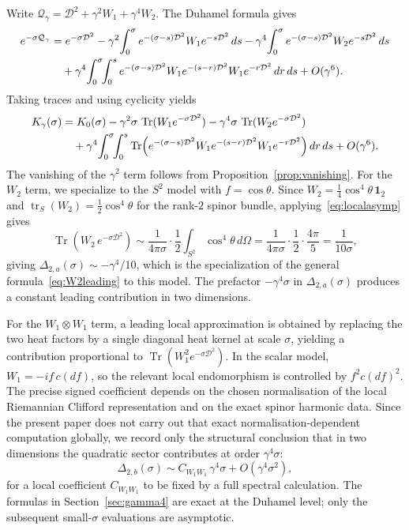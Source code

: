 \documentclass[11pt,a4paper]{article}
\numberwithin{equation}{section}
\theoremstyle{definition}
\newcommand{\cD}{\mathcal{D}}
\newcommand{\Qg}{\mathcal{Q}_\gamma}
\newcommand{\Tr}{\operatorname{Tr}}
\newcommand{\tr}{\operatorname{tr}}
\begin{document}
Write $\Qg=\cD^2+\gamma^2W_1+\gamma^4W_2$. The Duhamel formula gives
\begin{align}
e^{-\sigma\Qg}
&=e^{-\sigma\cD^2}
-\gamma^2\!\int_0^\sigma e^{-(\sigma-s)\cD^2}W_1e^{-s\cD^2}\,ds
-\gamma^4\!\int_0^\sigma e^{-(\sigma-s)\cD^2}W_2e^{-s\cD^2}\,ds
\notag\\
&\quad +\gamma^4\!\int_0^\sigma\!\!\int_0^s
e^{-(\sigma-s)\cD^2}W_1e^{-(s-r)\cD^2}W_1e^{-r\cD^2}\,dr\,ds
+O(\gamma^6).
\label{eq:duhamel_full}
\end{align}
Taking traces and using cyclicity yields
\begin{align}
K_\gamma(\sigma)
&=K_0(\sigma)
-\gamma^2\sigma\,\Tr(W_1e^{-\sigma\cD^2})
-\gamma^4\sigma\,\Tr(W_2e^{-\sigma\cD^2})\notag\\
&\quad +\gamma^4\!\int_0^\sigma\!\!\int_0^s
\Tr\!\left(e^{-(\sigma-s)\cD^2}W_1e^{-(s-r)\cD^2}W_1e^{-r\cD^2}\right)
dr\,ds+O(\gamma^6).
\end{align}
The vanishing of the $\gamma^2$ term follows from
Proposition~\ref{prop:vanishing}. For the $W_2$ term, we specialize to
the $S^2$ model with $f=\cos\theta$. Since
$W_2=\tfrac{1}{4}\cos^4\theta\,\mathbf{1}_2$ and
$\tr_S(W_2)=\tfrac{1}{2}\cos^4\theta$ for the rank-$2$ spinor bundle,
applying~\eqref{eq:localasymp} gives
\begin{equation}
\Tr(W_2\,e^{-\sigma\cD^2})\sim
\frac{1}{4\pi\sigma}\cdot\frac{1}{2}\int_{S^2}\cos^4\theta\,d\Omega
=\frac{1}{4\pi\sigma}\cdot\frac{1}{2}\cdot\frac{4\pi}{5}
=\frac{1}{10\sigma},
\end{equation}
giving $\Delta_{2,a}(\sigma)\sim -\gamma^4/10$, which is the
specialization of the general formula~\eqref{eq:W2leading} to this
model. The prefactor $-\gamma^4\sigma$ in $\Delta_{2,a}(\sigma)$ produces
a constant leading contribution in two dimensions.

For the $W_1\otimes W_1$ term, a leading local approximation is obtained
by replacing the two heat factors by a single diagonal heat kernel at
scale $\sigma$, yielding a contribution proportional to
$\Tr(W_1^2e^{-\sigma\cD^2})$. In the scalar model, $W_1=-if\,c(df)$, so
the relevant local endomorphism is controlled by $f^2c(df)^2$. The
precise signed coefficient depends on the chosen normalisation of the
local Riemannian Clifford representation and on the exact spinor harmonic
data. Since the present paper does not carry out that exact
normalisation-dependent computation globally, we record only the
structural conclusion that in two dimensions the quadratic sector
contributes at order $\gamma^4\sigma$:
\begin{equation}
\Delta_{2,b}(\sigma)\sim C_{W_1W_1}\,\gamma^4\sigma
+O(\gamma^4\sigma^2),
\end{equation}
for a local coefficient $C_{W_1W_1}$ to be fixed by a full spectral
calculation. The formulas in Section~\ref{sec:gamma4} are exact at the
Duhamel level; only the subsequent small-$\sigma$ evaluations are
asymptotic.




\end{document}
